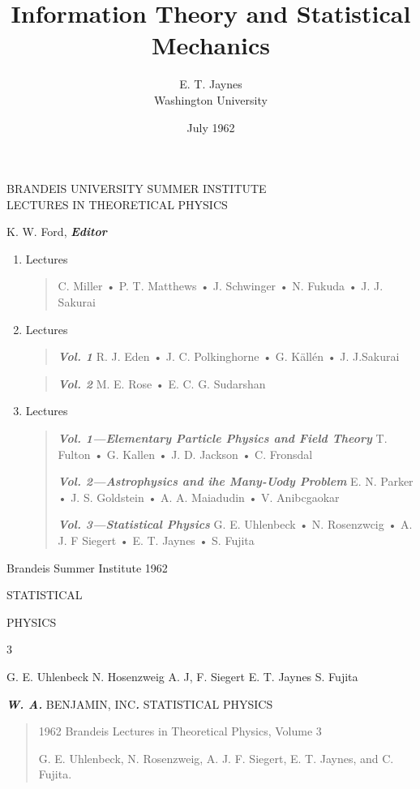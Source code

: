 \documentclass[]{article}
\title{Information Theory and Statistical Mechanics}
\author{E. T. Jaynes\\
Washington University}
\date{July 1962}
\begin{document}
BRANDEIS UNIVERSITY SUMMER INSTITUTE\\
LECTURES IN THEORETICAL PHYSICS

K. W. Ford, \emph{\textbf{Editor}}

\begin{enumerate}
\def\labelenumi{\arabic{enumi}.}
\setcounter{enumi}{1959}
\item
  Lectures

\begin{quote}
C. Miller • P. T. Matthews • J. Schwinger • N. Fukuda • J. J. Sakurai
\end{quote}

\item Lectures
  \begin{quote}
  \emph{\textbf{Vol. 1}}
R. J. Eden • J. C. Polkinghorne • G. Källén • J. J.Sakurai
\end{quote}


\begin{quote}
\emph{\textbf{Vol. 2}}
M. E. Rose • E. C. G. Sudarshan
\end{quote}

\item
  Lectures

\begin{quote}
\emph{\textbf{Vol. 1---Elementary Particle Physics and Field Theory}} T.
Fulton • G. Kallen • J. D. Jackson • C. Fronsdal

\emph{\textbf{Vol. 2---Astrophysics and ihe Many-Uody Problem}} E. N.
Parker • J. S. Goldstein • A. A. Maiadudin • V. Anibcgaokar

\emph{\textbf{Vol. 3---Statistical Physics}} G. E. Uhlenbeck • N.
Rosenzwcig • A. J. F Siegert • E. T. Jaynes • S. Fujita
\end{quote}

\end{enumerate}

Brandeis Summer Institute 1962

STATISTICAL

PHYSICS

3

G. E. Uhlenbeck N. Hosenzweig A. J, F. Siegert E. T. Jaynes S. Fujita

\emph{\textbf{W. A.}} BENJAMIN, INC\emph{\textbf{.}} STATISTICAL PHYSICS

\begin{quote}
1962 Brandeis Lectures in Theoretical Physics, Volume 3

G. E. Uhlenbeck, N. Rosenzweig, A. J. F. Siegert, E. T. Jaynes, and C.
Fujita.
\end{quote}
\end{document}
